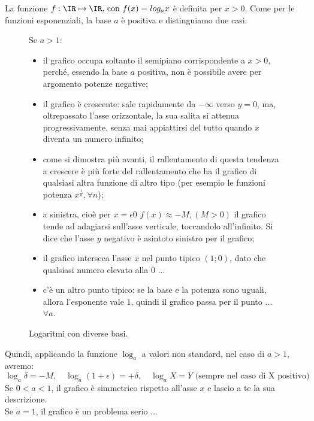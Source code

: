 La funzione \(f:\IR\mapsto \IR \text{, con } f(x)= log_a x\)
è definita per \(x>0\). Come per le funzioni esponenziali, 
la base \(a\) è positiva e distinguiamo due casi.

\begin{figure}[h]
\begin{minipage}{.4\textwidth}
 \begin{inaccessibleblock}
  \logduebasi
 \end{inaccessibleblock}
\end{minipage}
\hspace{12pt}
\begin{minipage}{.6\textwidth}
Se $a>1$:
\begin{itemize} [noitemsep]
 \item 
il grafico occupa soltanto il semipiano corrispondente a $x>0$, perché,
essendo la base $a$ positiva, non è possibile avere per argomento potenze
negative;
 \item
il grafico è crescente: sale rapidamente da $-\infty$ verso $y=0$, ma, oltrepassato
l'asse orizzontale, la sua salita si attenua progressivamente, 
senza mai appiattirsi del tutto quando $x$ diventa un numero infinito; 
 \item 
come si dimostra più avanti, il rallentamento di questa tendenza a crescere
è più forte del rallentamento che ha il grafico di qualsiasi altra
funzione di altro tipo (per esempio le funzioni potenza $x^{\frac{1}{n}}, \forall n$);
 \item
a sinistra, cioè per $x=\epsilon 0$ $f(x)\approx -M, (M>0)$ il grafico tende 
ad adagiarsi sull'asse verticale, toccandolo all'infinito. Si dice che l'asse
$y$ negativo è asintoto sinistro per il grafico;
 \item
il grafico interseca l'asse $x$ nel punto tipico $(1;0)$, dato che qualsiasi numero
elevato alla 0 ...
 \item
c'è un altro punto tipico: se la base e la potenza sono uguali, allora 
l'esponente vale $1$, quindi il grafico passa per il punto ... $\forall a$.
\end{itemize}

\end{minipage}
  \caption{Logaritmi con diverse basi.} \label{fig:diversebasi}
\end{figure}

Quindi, applicando la funzione $\log_a$ a valori non standard, nel caso di $a>1$, 
avremo: 
\[
 \log_a \delta=-M, \quad \log_a (1+\epsilon)=+\delta,\quad \log_a X=Y 
 \text{ (sempre nel caso di X positivo)}
\]
Se $0<a<1$, il grafico è simmetrico rispetto all'asse $x$ e lascio a te la 
sua descrizione.\\
Se $a=1$, il grafico è un problema serio ...\\


